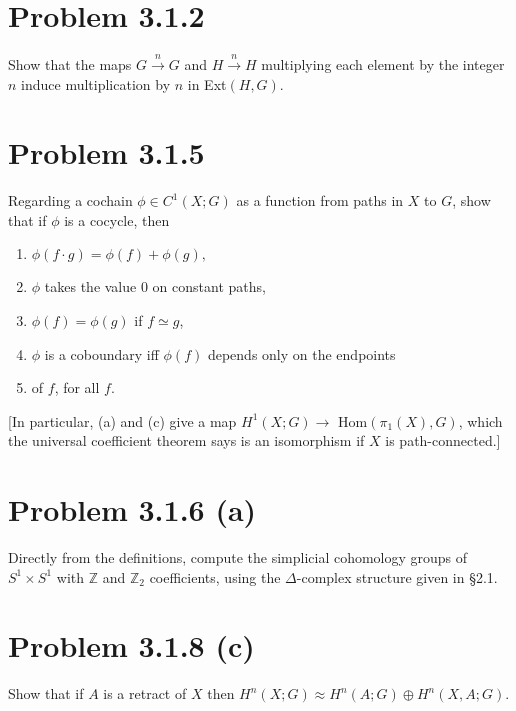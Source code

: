 \documentclass{article}
\theoremstyle{definition}
\begin{document}
\section*{Problem 3.1.2}
Show that the maps $G \xrightarrow{n}G$ and $H\xrightarrow{n}H$ multiplying
each element by the integer $n$ induce multiplication by $n$ in Ext$(H,G)$.

\section*{Problem 3.1.5}
Regarding a cochain $\phi \in C^1(X;G)$ as a function from paths in $X$ to 
$G$, show that if $\phi$ is a cocycle, then 
\begin{enumerate}
    \item $\phi(f \cdot g) = \phi(f) + \phi(g),$
    \item $\phi$ takes the value 0 on constant paths,
    \item $\phi(f) = \phi(g)$ if $f \simeq g$,
    \item $\phi$ is a coboundary iff $\phi(f)$ depends only on the endpoints 
    \item of $f$, for all $f$. 
\end{enumerate}
[In particular, (a) and (c) give a map $H^1(X;G) \to$ Hom$(\pi_1(X),G)$,
which the universal coefficient theorem says is an isomorphism if $X$ 
is path-connected.]

\section*{Problem 3.1.6 (a)}
Directly from the definitions, compute the simplicial cohomology groups 
of $S^1 \times S^1$ with $\mathbb{Z}$ and $\mathbb{Z}_2$ coefficients,
using the $\Delta$-complex structure given in \S 2.1.

\section*{Problem 3.1.8 (c)}
Show that if $A$ is a retract of $X$ then $H^n(X;G) \approx H^n(A;G) \oplus H^n(X,A;G)$.
\end{document}
